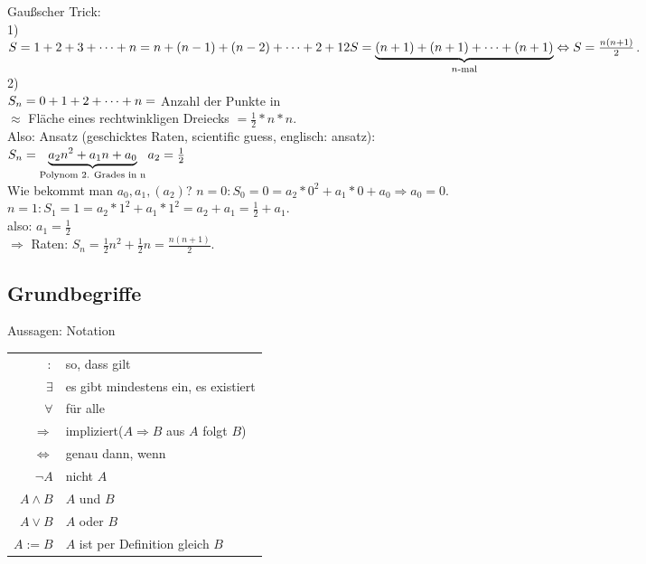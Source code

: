 \documentclass[../ana1.tex]{subfiles}
\begin{document}
\begin{bem}
	Gaußscher Trick:\\
	1)\\
	\(S=1+2+3+\dots+n=n+(n-1)+(n-2)+\dots+2+1\\
	2S = \underbrace{(n+1)+(n+1)+\dots+(n+1)}_{n\text{-mal}} \Leftrightarrow S =
	\frac{n(n+1)}{2}\).\\
	2)\\
	\(S_n = 0 + 1 + 2 + \dots + n\\=\) Anzahl der Punkte in\\
	\(\approx\) Fläche eines rechtwinkligen Dreiecks \(=\frac{1}{2}*n*n\).\\
	Also: Ansatz (\glqq geschicktes Raten\grqq , \glqq scientific guess\grqq , englisch: ansatz):\\
	\(S_n = \underbrace{a_2 n^2 + a_1 n + a_0}_{\text{Polynom 2. Grades in n}}\\
	a_2 = \frac{1}{2}\)\\
	Wie bekommt man \(a_0, a_1, (a_2)\)?
	\(n=0: S_0 = 0 = a_2*0^2+a_1*0+a_0 \Rightarrow a_0 = 0\).\\
	\(n=1: S_1 = 1 = a_2*1^2+a_1*1^2 = a_2 + a_1 = \frac{1}{2} + a_1\).\\
	also: \(a_1 = \frac{1}{2}\)\\
	\(\Rightarrow\) Raten: \(S_n = \frac{1}{2}n^2 + \frac{1}{2} n = \frac{n(n+1)}{2}\).
\end{bem}

\subsection{Grundbegriffe}
Aussagen: Notation\\
\begin{tabular}{r|l}
	\(:\)               & \glqq so, dass gilt\grqq                                                    \\
	\(\exists\)         & \glqq es gibt mindestens ein\grqq , \glqq es existiert\grqq                 \\
	\(\forall\)         & \glqq für alle\grqq                                                         \\
	\(\Rightarrow\)     & \glqq impliziert\grqq(\(A \Rightarrow B\) \glqq aus \(A\) folgt \(B\)\grqq) \\
	\(\Leftrightarrow\) & \glqq genau dann, wenn\grqq                                                 \\
	\(\neg A\)          & nicht \(A\)                                                                 \\
	\(A \wedge B\)      & \(A\) und \(B\)                                                             \\
	\(A \vee B\)        & \(A\) oder \(B\)                                                            \\
	\(A := B\)          & \(A\) ist per Definition gleich \(B\)
\end{tabular}
\end{document}
